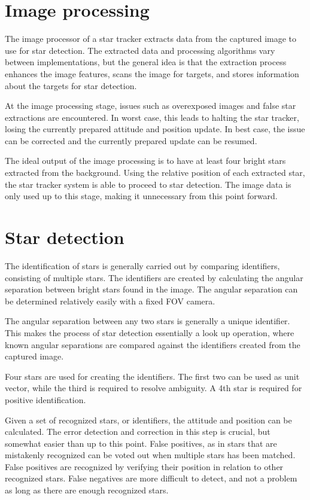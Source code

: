 \documentclass[12pt]{report}
\begin{document}
\section{Image processing}
The image processor of a star tracker extracts data from the captured image to use for star detection. The extracted data and processing algorithms vary between implementations, but the general idea is that the extraction process enhances the image features, scans the image for targets, and stores information about the targets for star detection.
\par
At the image processing stage, issues such as overexposed images and false star extractions are encountered. In worst case, this leads to halting the star tracker, losing the currently prepared attitude and position update. In best case, the issue can be corrected and the currently prepared update can be resumed.   
\par
The ideal output of the image processing is to have at least four bright stars extracted from the background. Using the relative position of each extracted star, the star tracker system is able to proceed to star detection. The image data is only used up to this stage, making it unnecessary from this point forward.

\section{Star detection}
The identification of stars is generally carried out by comparing identifiers, consisting of multiple stars. The identifiers are created by calculating the angular separation between bright stars found in the image. The angular separation can be determined relatively easily with a fixed FOV camera. \citep*{SatDesgin}
\par
The angular separation between any two stars is generally a unique identifier. This makes the process of star detection essentially a look up operation, where known angular separations are compared against the identifiers created from the captured image. \citep*{SatDesgin}
\par
Four stars are used for creating the identifiers. The first two can be used as unit vector, while the third is required to resolve ambiguity. A 4th star is required for positive identification. \citep*{SatDesgin} \citep*{StreakDet}
\par
Given a set of recognized stars, or identifiers, the attitude and position can be calculated. The error detection and correction in this step is crucial, but somewhat easier than up to this point. False positives, as in stars that are mistakenly recognized can be voted out when multiple stars has been matched. False positives are recognized by verifying their position in relation to other recognized stars. False negatives are more difficult to detect, and not a problem as long as there are enough recognized stars.
\end{document}

